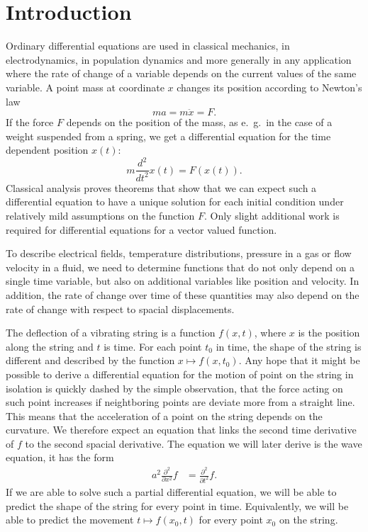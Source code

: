 %
%
%
\chapter*{Introduction
\label{chapter:intro}}
Ordinary differential equations are used in classical mechanics,
in electrodynamics, in population dynamics and more generally in any
application where the rate of change of a variable depends on the current
values of the same variable.
A point mass at coordinate $x$ changes its position according to 
Newton's law
\[
ma=m\ddot x=F.
\]
If the force $F$ depends on the position of the mass, as e.~g.~in the
case of a weight suspended from a spring, we get a differential equation
for the time dependent position $x(t)$:
\[
m\frac{d^2}{dt^2}x(t)=F(x(t)).
\]
Classical analysis proves theorems that show that we can expect such
a differential equation to have a unique solution for each
initial condition under relatively mild assumptions on the function $F$.
Only slight additional work is required for differential equations 
for a vector valued function.

To describe electrical fields, temperature distributions, pressure
in a gas or flow velocity in a fluid, we need to determine functions 
that do not only depend on a single time variable, but also on additional
variables like position and velocity.
In addition, the rate of change over time of these quantities may also depend
on the rate of change with respect to spacial displacements.

The deflection of a vibrating string is a function $f(x,t)$, where $x$ is
the position along the string and $t$ is time.
For each point $t_0$ in time, the shape of the string is different and
described by the function $x\mapsto f(x,t_0)$.
Any hope that it might be possible to derive a differential equation
for the motion of point on the string in isolation is quickly dashed
by the simple observation, that the force acting on such point
increases if neightboring points are deviate more from a straight line.
This means that the acceleration of a point on the string depends on 
the curvature.
We therefore expect an equation that links the second time derivative of $f$
to the second spacial derivative.
The equation we will later derive is the wave equation, it has the form
\begin{align*}
a^2\frac{\partial^2}{\partial x^2}f&= \frac{\partial^2}{\partial t^2}f.
\end{align*}
If we are able to solve such a partial differential equation,
we will be able to predict the shape of the string for every point in
time.
Equivalently, we will be able to predict the movement $t\mapsto f(x_0,t)$
for every point $x_0$ on the string.

